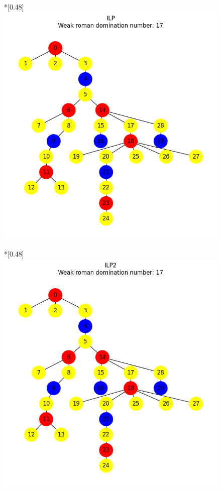     \begin{figure}[H]
        \centering
        \begin{subcaptionbox}*{}[0.48\linewidth]
            {\includegraphics[width=0.75\linewidth]{assets/plots/ILP/RandomTree_n30_i2_results.png}}
        \end{subcaptionbox}
        \hfill
        \begin{subcaptionbox}*{}[0.48\linewidth]
            {\includegraphics[width=0.75\linewidth]{assets/plots/ILP2/RandomTree_n30_i2_results.png}}
        \end{subcaptionbox}
        \hfill

\end{figure}
